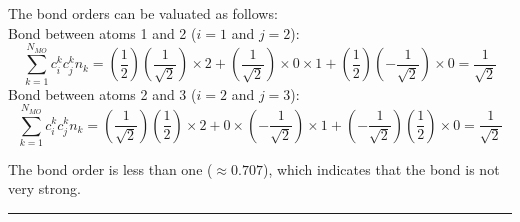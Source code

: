 \noindent
The bond orders can be valuated as follows:\\

\noindent
Bond between atoms 1 and 2 ($i = 1$ and $j = 2$):\\
$$\sum_{k=1}^{N_{MO}}c_i^k c_j^k n_k = 
\left(\frac{1}{2}\right)\left(\frac{1}{\sqrt{2}}\right)\times
2 + \left(\frac{1}{\sqrt{2}}\right)\times 0\times 1 
+ \left(\frac{1}{2}\right)\left(-\frac{1}{\sqrt{2}}\right)\times 0 
= \frac{1}{\sqrt{2}}$$
Bond between atoms 2 and 3 ($i = 2$ and $j = 3$):\\
$$\sum_{k=1}^{N_{MO}}c_i^k c_j^k n_k = 
\left(\frac{1}{\sqrt{2}}\right)\left(\frac{1}{2}\right)\times
2 + 0\times\left(-\frac{1}{\sqrt{2}}\right)\times 1
+ \left(-\frac{1}{\sqrt{2}}\right)\left(\frac{1}{2}\right)\times 0 
= \frac{1}{\sqrt{2}}$$

\noindent
The bond order is less than one ($\approx 0.707$), which indicates that
the bond is not very strong.\\

\hrule\vspace{0.5cm}
